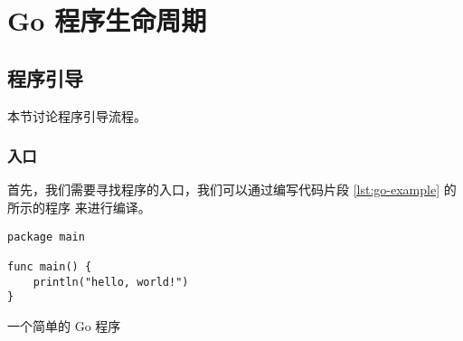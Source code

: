 \chapter{Go 程序生命周期}

\section{程序引导}

本节讨论程序引导流程。

\subsection{入口}

首先，我们需要寻找程序的入口，我们可以通过编写代码片段 \ref{lst:go-example} 的所示的程序
来进行编译。

\begin{listing}[H]
\begin{verbatim}
package main

func main() {
	println("hello, world!")
}
\end{verbatim}
\caption{一个简单的 Go 程序}
\label{lst:go-example}
\end{listing}